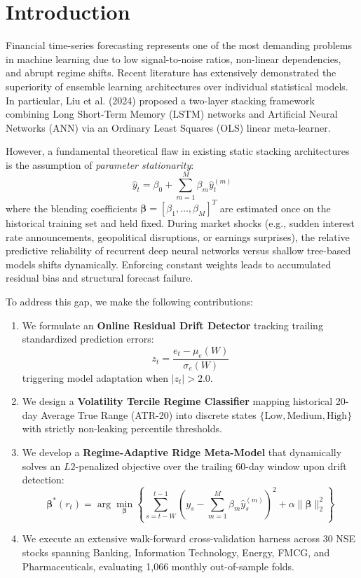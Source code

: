 \documentclass[conference]{IEEEtran}
\begin{document}
\section{Introduction}
Financial time-series forecasting represents one of the most demanding problems in machine learning due to low signal-to-noise ratios, non-linear dependencies, and abrupt regime shifts. Recent literature has extensively demonstrated the superiority of ensemble learning architectures over individual statistical models. In particular, Liu et al. (2024) proposed a two-layer stacking framework combining Long Short-Term Memory (LSTM) networks and Artificial Neural Networks (ANN) via an Ordinary Least Squares (OLS) linear meta-learner.

However, a fundamental theoretical flaw in existing static stacking architectures is the assumption of \textit{parameter stationarity}:
\begin{equation}
\hat{y}_t = \beta_0 + \sum_{m=1}^M \beta_m \hat{y}_{t}^{(m)}
\end{equation}
where the blending coefficients $\boldsymbol{\beta} = [\beta_1, \dots, \beta_M]^T$ are estimated once on the historical training set and held fixed. During market shocks (e.g., sudden interest rate announcements, geopolitical disruptions, or earnings surprises), the relative predictive reliability of recurrent deep neural networks versus shallow tree-based models shifts dynamically. Enforcing constant weights leads to accumulated residual bias and structural forecast failure.

To address this gap, we make the following contributions:
\begin{enumerate}
    \item We formulate an \textbf{Online Residual Drift Detector} tracking trailing standardized prediction errors:
    \begin{equation}
    z_t = \frac{e_t - \mu_e(W)}{\sigma_e(W)}
    \end{equation}
    triggering model adaptation when $|z_t| > 2.0$.
    \item We design a \textbf{Volatility Tercile Regime Classifier} mapping historical 20-day Average True Range (ATR-20) into discrete states $\{ \text{Low}, \text{Medium}, \text{High} \}$ with strictly non-leaking percentile thresholds.
    \item We develop a \textbf{Regime-Adaptive Ridge Meta-Model} that dynamically solves an $L2$-penalized objective over the trailing 60-day window upon drift detection:
    \begin{equation}
    \boldsymbol{\beta}^*(r_t) = \arg\min_{\boldsymbol{\beta}} \left\{ \sum_{s=t-W}^{t-1} \left( y_s - \sum_{m=1}^M \beta_m \hat{y}_s^{(m)} \right)^2 + \alpha \|\boldsymbol{\beta}\|_2^2 \right\}
    \end{equation}
    \item We execute an extensive walk-forward cross-validation harness across 30 NSE stocks spanning Banking, Information Technology, Energy, FMCG, and Pharmaceuticals, evaluating 1,066 monthly out-of-sample folds.
\end{enumerate}
\end{document}
